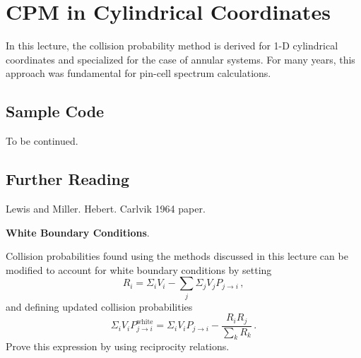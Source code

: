 \chapter{CPM in Cylindrical Coordinates}
\label{lec:cpm_cylinder}

In this lecture, the collision probability method is derived for 
1-D cylindrical coordinates and specialized for the case of 
annular systems.  For many years, this approach was fundamental for 
pin-cell spectrum calculations.

\section*{Sample Code}

To be continued.

\section*{Further Reading}

Lewis and Miller. Hebert.  Carlvik 1964 paper.

\begin{exercises}

  \item \textbf{White Boundary Conditions}. 
  
  Collision probabilities 
  found using the methods discussed in this lecture can be modified to 
  account for white boundary conditions by setting 
  \begin{equation*}
  R_i =  \Sigma_{i}V_i - \sum_{j} \Sigma_j V_j P_{j\to i} \, ,
  \end{equation*}
  and defining updated collision probabilities
  \begin{equation*}
  \Sigma_{i}V_i P^{\text{white}}_{j\to i} = 
    \Sigma_{i}V_i P_{j \to i} - \frac{R_i R_j}{\sum_k R_k} \, .
  \end{equation*}
  Prove this expression by using reciprocity relations.

    
\end{exercises}